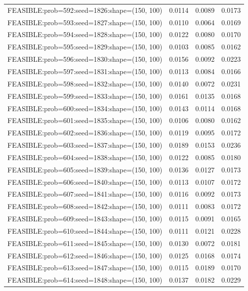 \begin{longtable}{lccc}
FEASIBLE:prob=592:seed=1826:shape=(150, 100) &   0.0114 & 0.0089 & 0.0173 \\
FEASIBLE:prob=593:seed=1827:shape=(150, 100) &   0.0110 & 0.0064 & 0.0169 \\
FEASIBLE:prob=594:seed=1828:shape=(150, 100) &   0.0122 & 0.0080 & 0.0170 \\
FEASIBLE:prob=595:seed=1829:shape=(150, 100) &   0.0103 & 0.0085 & 0.0162 \\
FEASIBLE:prob=596:seed=1830:shape=(150, 100) &   0.0156 & 0.0092 & 0.0223 \\
FEASIBLE:prob=597:seed=1831:shape=(150, 100) &   0.0113 & 0.0084 & 0.0166 \\
FEASIBLE:prob=598:seed=1832:shape=(150, 100) &   0.0140 & 0.0072 & 0.0231 \\
FEASIBLE:prob=599:seed=1833:shape=(150, 100) &   0.0161 & 0.0135 & 0.0168 \\
FEASIBLE:prob=600:seed=1834:shape=(150, 100) &   0.0143 & 0.0114 & 0.0168 \\
FEASIBLE:prob=601:seed=1835:shape=(150, 100) &   0.0106 & 0.0080 & 0.0162 \\
FEASIBLE:prob=602:seed=1836:shape=(150, 100) &   0.0119 & 0.0095 & 0.0172 \\
FEASIBLE:prob=603:seed=1837:shape=(150, 100) &   0.0189 & 0.0153 & 0.0236 \\
FEASIBLE:prob=604:seed=1838:shape=(150, 100) &   0.0122 & 0.0085 & 0.0180 \\
FEASIBLE:prob=605:seed=1839:shape=(150, 100) &   0.0136 & 0.0127 & 0.0173 \\
FEASIBLE:prob=606:seed=1840:shape=(150, 100) &   0.0113 & 0.0107 & 0.0172 \\
FEASIBLE:prob=607:seed=1841:shape=(150, 100) &   0.0116 & 0.0092 & 0.0173 \\
FEASIBLE:prob=608:seed=1842:shape=(150, 100) &   0.0111 & 0.0083 & 0.0172 \\
FEASIBLE:prob=609:seed=1843:shape=(150, 100) &   0.0115 & 0.0091 & 0.0165 \\
FEASIBLE:prob=610:seed=1844:shape=(150, 100) &   0.0111 & 0.0121 & 0.0228 \\
FEASIBLE:prob=611:seed=1845:shape=(150, 100) &   0.0130 & 0.0072 & 0.0181 \\
FEASIBLE:prob=612:seed=1846:shape=(150, 100) &   0.0125 & 0.0168 & 0.0174 \\
FEASIBLE:prob=613:seed=1847:shape=(150, 100) &   0.0115 & 0.0189 & 0.0170 \\
FEASIBLE:prob=614:seed=1848:shape=(150, 100) &   0.0137 & 0.0182 & 0.0229 \\

\end{longtable}

